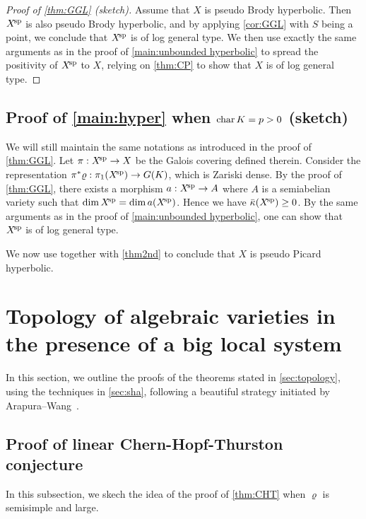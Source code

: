 \documentclass[english]{amsproc}
\theoremstyle{plain}
\theoremstyle{definition}
\theoremstyle{remark}
\theoremstyle{plain}
\numberwithin{equation}{thm} %
\newcommand{\xsp}{X^{\! \rm sp}}
\begin{document}
\begin{proof}[Proof of \cref{thm:GGL} (sketch)]
		
		
		\medspace
		
		Assume that $X$ is pseudo Brody hyperbolic. Then $\xsp$ is also pseudo Brody hyperbolic, and by applying \cref{cor:GGL} with $S$ being a point, we conclude that $\xsp$ is of log general type. We then use exactly the same arguments as in the proof of \cref{main:unbounded hyperbolic} to spread the positivity of $\xsp$ to $X$, relying on \cref{thm:CP} to show that $X$ is of log general type. 
	\end{proof}
	
	\subsection{Proof of \cref{main:hyper} when ${\rm char}\, K=p>0$ (sketch)}  
	We will still maintain the same notations as introduced in the proof of \cref{thm:GGL}.	Let $\pi:\xsp\to X$ be the Galois covering  defined therein.  Consider the representation $\pi^*\varrho:\pi_1(\xsp)\to G(K)$, which is Zariski dense. By the proof of \cref{thm:GGL}, there exists a morphism $a:\xsp\to A$ where $A$ is a semiabelian variety such that $\dim \xsp=\dim a(\xsp)$. Hence we have $\bar{\kappa}(\xsp)\geq 0$.   By the same arguments as in the proof of \cref{main:unbounded hyperbolic}, one can show that 
	$\xsp$ is of log general type.   
	
	We now use   together with \cref{thm2nd}     to conclude that $X$ is pseudo Picard hyperbolic.   
	
	
	\section{Topology of algebraic varieties in the presence of a big local system}\label{sec:topology2}
 In this section, we outline the proofs of the theorems stated in \cref{sec:topology}, using the techniques in \cref{sec:sha}, following a beautiful strategy initiated by Arapura--Wang~\cite{AW25}.
 

	
	\subsection{Proof of linear Chern-Hopf-Thurston conjecture}
	In this subsection, we skech the idea of the proof of \cref{thm:CHT} when $\varrho$ is semisimple and large. 
	
\end{document}
